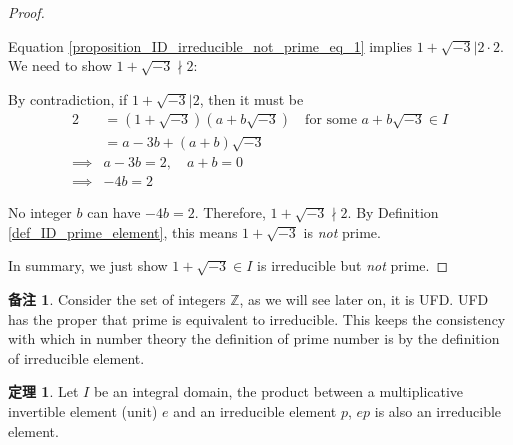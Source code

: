 \documentclass[utf8]{ctexbook}
\theoremstyle{definition}
\newtheorem{prototheorem}{定理}[section]
\newenvironment{theorem}
   {\colorlet{shadecolor}{red!30}\begin{shaded}\begin{prototheorem}}
   {\end{prototheorem}\end{shaded}}
\newtheorem{memo}{备注}[section]
\begin{document}
\begin{proof}
\begin{enumerate}
{Equation \ref{proposition_ID_irreducible_not_prime_eq_1} implies $1 + \sqrt{-3} | 2 \cdot 2$. We need to show $1 + \sqrt{-3} \nmid 2 $:

By contradiction, if $1 + \sqrt{-3} | 2 $, then it must be
\begin{align*}
2 &= ( 1 + \sqrt{-3}) ( a + b \sqrt{-3} ) \quad \mbox{for some }  a + b \sqrt{-3} \in I \\
&= a - 3b + (a+b) \sqrt{-3} \\
\implies & a - 3b =2, \quad a + b = 0 \\
\implies & - 4b = 2 
\end{align*}

No integer $b$ can have $- 4b = 2 $. Therefore, $1 + \sqrt{-3} \nmid 2 $. By Definition \ref{def_ID_prime_element}, this means $ 1 + \sqrt{-3} $ is \emph{not} prime.
}
\end{enumerate}

In summary, we just show $ 1 + \sqrt{-3} \in I$ is irreducible but \emph{not} prime.

\end{proof}

\begin{memo}
Consider the set of integers $\mathbb{Z}$, as we will see later on, it is UFD. UFD has the proper that prime is equivalent to irreducible. This keeps the consistency with which in number theory the definition of prime number is by the definition of irreducible element.
\end{memo}


\begin{theorem}\label{integral_domain_unique_factorization_theorem_2}
Let $I$ be an integral domain, the product between a multiplicative invertible element (unit) $e$ and an irreducible element $p$, $e p$ is also an irreducible element.
\end{theorem}
\end{document}
